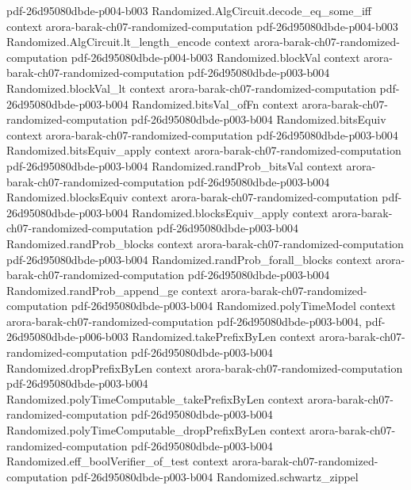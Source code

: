 \begin{theorem}
  {pdf-26d95080dbde-p004-b003}
\proofstep
  {Randomized.AlgCircuit.decode_eq_some_iff}
  {context}
  {arora-barak-ch07-randomized-computation}
  {pdf-26d95080dbde-p004-b003}
\proofstep
  {Randomized.AlgCircuit.lt_length_encode}
  {context}
  {arora-barak-ch07-randomized-computation}
  {pdf-26d95080dbde-p004-b003}
\proofstep
  {Randomized.blockVal}
  {context}
  {arora-barak-ch07-randomized-computation}
  {pdf-26d95080dbde-p003-b004}
\proofstep
  {Randomized.blockVal_lt}
  {context}
  {arora-barak-ch07-randomized-computation}
  {pdf-26d95080dbde-p003-b004}
\proofstep
  {Randomized.bitsVal_ofFn}
  {context}
  {arora-barak-ch07-randomized-computation}
  {pdf-26d95080dbde-p003-b004}
\proofstep
  {Randomized.bitsEquiv}
  {context}
  {arora-barak-ch07-randomized-computation}
  {pdf-26d95080dbde-p003-b004}
\proofstep
  {Randomized.bitsEquiv_apply}
  {context}
  {arora-barak-ch07-randomized-computation}
  {pdf-26d95080dbde-p003-b004}
\proofstep
  {Randomized.randProb_bitsVal}
  {context}
  {arora-barak-ch07-randomized-computation}
  {pdf-26d95080dbde-p003-b004}
\proofstep
  {Randomized.blocksEquiv}
  {context}
  {arora-barak-ch07-randomized-computation}
  {pdf-26d95080dbde-p003-b004}
\proofstep
  {Randomized.blocksEquiv_apply}
  {context}
  {arora-barak-ch07-randomized-computation}
  {pdf-26d95080dbde-p003-b004}
\proofstep
  {Randomized.randProb_blocks}
  {context}
  {arora-barak-ch07-randomized-computation}
  {pdf-26d95080dbde-p003-b004}
\proofstep
  {Randomized.randProb_forall_blocks}
  {context}
  {arora-barak-ch07-randomized-computation}
  {pdf-26d95080dbde-p003-b004}
\proofstep
  {Randomized.randProb_append_ge}
  {context}
  {arora-barak-ch07-randomized-computation}
  {pdf-26d95080dbde-p003-b004}
\proofstep
  {Randomized.polyTimeModel}
  {context}
  {arora-barak-ch07-randomized-computation}
  {pdf-26d95080dbde-p003-b004,
    pdf-26d95080dbde-p006-b003}
\proofstep
  {Randomized.takePrefixByLen}
  {context}
  {arora-barak-ch07-randomized-computation}
  {pdf-26d95080dbde-p003-b004}
\proofstep
  {Randomized.dropPrefixByLen}
  {context}
  {arora-barak-ch07-randomized-computation}
  {pdf-26d95080dbde-p003-b004}
\proofstep
  {Randomized.polyTimeComputable_takePrefixByLen}
  {context}
  {arora-barak-ch07-randomized-computation}
  {pdf-26d95080dbde-p003-b004}
\proofstep
  {Randomized.polyTimeComputable_dropPrefixByLen}
  {context}
  {arora-barak-ch07-randomized-computation}
  {pdf-26d95080dbde-p003-b004}
\proofstep
  {Randomized.eff_boolVerifier_of_test}
  {context}
  {arora-barak-ch07-randomized-computation}
  {pdf-26d95080dbde-p003-b004}
\proofstep
  {Randomized.schwartz_zippel}

\end{theorem}
